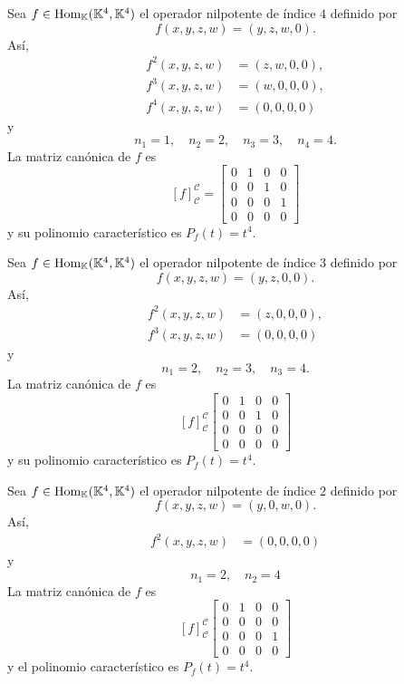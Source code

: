\begin{ejem}\label{ejnil1}
Sea $f\in\operatorname{Hom}_{\mathbb{K}}(\mathbb{K}^4,\mathbb{K}^4)$ el operador nilpotente de índice $4$ definido por
$$f(x,y,z,w)=(y,z,w,0).$$
As\'i,
\begin{align*}
f^2(x,y,z,w) & = (z,w,0,0),\\
f^3(x,y,z,w) & = (w,0,0,0),\\
f^4(x,y,z,w) & = (0,0,0,0)
\end{align*}
y
$$n_1=1,\quad n_2=2,\quad n_3=3,\quad n_4=4.$$
La matriz canónica de $f$ es
$$
\left[f\right]^{\mathcal{C}}_{\mathcal{C}}=\left[\begin{array}{rrrr}
0 & 1 & 0 & 0\\
0 & 0 & 1 & 0\\
0 & 0 & 0 & 1\\
0 & 0 & 0 & 0
\end{array}\right]
$$
y su polinomio caracter\'istico es $P_f(t)=t^4$.
\end{ejem}

\begin{ejem}\label{ejnil2}
Sea $f\in\operatorname{Hom}_{\mathbb{K}}(\mathbb{K}^4,\mathbb{K}^4)$ el operador nilpotente de índice $3$ definido por
$$f(x,y,z,w)=(y,z,0,0).$$
As\'i,
\begin{align*}
f^2(x,y,z,w) & = (z,0,0,0),\\
f^3(x,y,z,w) & = (0,0,0,0)
\end{align*}
y
$$n_1=2,\quad n_2=3,\quad n_3=4.$$
La matriz canónica de $f$ es
$$
\left[f\right]^{\mathcal{C}}_{\mathcal{C}}\left[\begin{array}{rrr|r}
0 & 1 & 0 & 0\\
0 & 0 & 1 & 0\\
0 & 0 & 0 & 0\\
\hline
0 & 0 & 0 & 0
\end{array}\right]
$$
y su polinomio caracter\'istico es $P_f(t)=t^4$.
\end{ejem}

\begin{ejem}\label{ejnil3}
Sea $f\in\operatorname{Hom}_{\mathbb{K}}(\mathbb{K}^4,\mathbb{K}^4)$ el operador nilpotente de índice $2$ definido por
$$f(x,y,z,w)=(y,0,w,0).$$
As\'i,
\begin{align*}
f^2(x,y,z,w) & = (0,0,0,0)
\end{align*}
y
$$n_1=2,\quad n_2=4$$
La matriz canónica de $f$ es
$$
\left[f\right]^{\mathcal{C}}_{\mathcal{C}}\left[\begin{array}{rr|rr}
0 & 1 & 0 & 0\\
0 & 0 & 0 & 0\\
\hline
0 & 0 & 0 & 1\\
0 & 0 & 0 & 0
\end{array}\right]
$$
y el polinomio caracter\'istico es $P_f(t)=t^4$.
\end{ejem}

